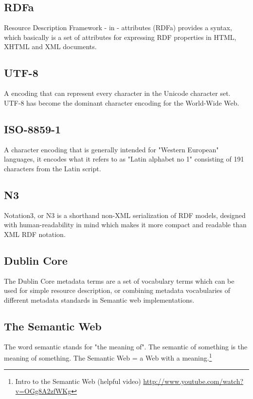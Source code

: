 \subsection*{RDFa} Resource Description Framework - in - attributes (RDFa) provides a syntax, which basically is a set of attributes for expressing RDF properties in HTML, XHTML and XML documents.

\subsection*{UTF-8} A encoding that can represent every character in the
Unicode character set. UTF-8 has become the dominant character encoding for
the World-Wide Web.

\subsection*{ISO-8859-1} A character encoding that is generally intended for
"Western European" languages, it encodes what it refers to as "Latin alphabet
no 1" consisting of 191 characters from the Latin script.

\subsection*{N3}
Notation3, or N3 is a shorthand non-XML serialization of RDF models,
designed with human-readability in mind which makes it more compact and
readable than XML RDF notation.

\subsection*{Dublin Core}
The Dublin Core metadata terms are a set of vocabulary terms which
can be used for simple resource description, or combining metadata
vocabularies of different metadata standards in Semantic web implementations.\cite{dublinBib} 

\subsection*{The Semantic Web}
The word semantic stands for "the meaning of". The semantic of something is the meaning of something. The Semantic Web = a Web with a meaning.\footnote{Intro to the Semantic Web (helpful video) \url{http://www.youtube.com/watch?v=OGg8A2zfWKg}}
